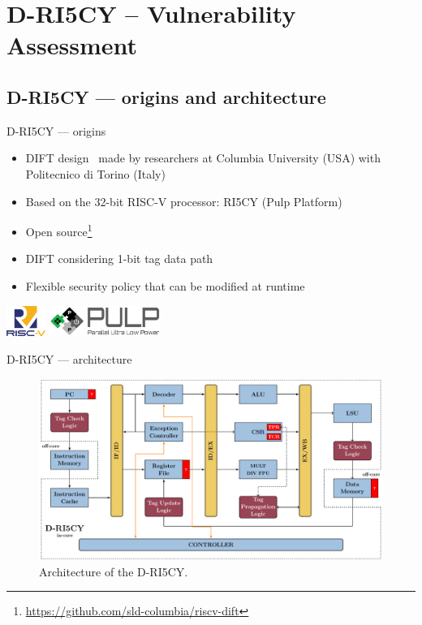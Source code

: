 \section{D-RI5CY -- Vulnerability Assessment}

\subsection{D-RI5CY — origins and architecture}
\begin{frame}{D-RI5CY — origins}
    \begin{itemize}
        \item DIFT design~\cite{PDGLC-18-hpec} made by researchers at Columbia University (USA) with Politecnico di Torino (Italy)
        \item Based on the 32-bit RISC-V processor: RI5CY (Pulp Platform)
        \item Open source\footnote{\footnotesize\url{https://github.com/sld-columbia/riscv-dift}}
        \item DIFT considering 1-bit tag data path
        \item Flexible security policy that can be modified at runtime
    \end{itemize}

    \centering
    \vfill
    \includegraphics[height=1cm]{img/logo/riscv.png}
    \hspace{1cm}
    \includegraphics[height=1cm]{img/logo/pulp_logo.pdf}
    \vfill
\end{frame}
\begin{frame}{D-RI5CY — architecture}
    \begin{figure}
        \centering
        \includegraphics[width=.9\textwidth]{src/2_vuln_assessment/img/RI5CY.pdf}
        \caption{Architecture of the D-RI5CY.}
        \label{fig:riscy}
    \end{figure}
\end{frame}
